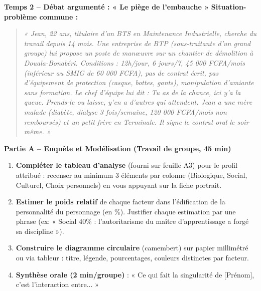 \documentclass[11pt]{article}
\newcounter{popsec}
\newcounter{popsub}
\newcommand{\courssub}[1]{%
  \stepcounter{popsub}%
  \par\vspace{9pt}\noindent{\popxbold\fontsize{11.5}{13}\selectfont\color{popink}{\color{poporange}\thepopsec.\thepopsub}\hspace{6pt}#1}\par\nopagebreak\vspace{4pt}
}
\begin{document}
\textbf{Temps 2 -- Débat argumenté : « Le piège de l'embauche »}
\textbf{Situation-problème commune :}
\begin{quote}
\textit{« Jean, 22 ans, titulaire d'un BTS en Maintenance Industrielle, cherche du travail depuis 14 mois. Une entreprise de BTP (sous-traitante d'un grand groupe) lui propose un poste de manœuvre sur un chantier de démolition à Douala-Bonabéri. Conditions : 12h/jour, 6 jours/7, 45 000 FCFA/mois (inférieur au SMIG de 60 000 FCFA), pas de contrat écrit, pas d'équipement de protection (casque, bottes, gants), manipulation d'amiante sans formation. Le chef d'équipe lui dit : \og{} Tu as de la chance, ici y'a la queue. Prends-le ou laisse, y'en a d'autres qui attendent. \fg{} Jean a une mère malade (diabète, dialyse 3 fois/semaine, 120 000 FCFA/mois non remboursés) et un petit frère en Terminale. Il signe le contrat oral le soir même. »}
\end{quote}

\courssub{Consignes}
\textbf{Partie A -- Enquête et Modélisation (Travail de groupe, 45 min)}
\begin{enumerate}
    \item \textbf{Compléter le tableau d'analyse} (fourni sur feuille A3) pour le profil attribué : recenser au minimum 3 éléments par colonne (Biologique, Social, Culturel, Choix personnels) en vous appuyant sur la fiche portrait.
    \item \textbf{Estimer le poids relatif} de chaque facteur dans l'édification de la personnalité du personnage (en \%). Justifier chaque estimation par une phrase (ex: « Social 40\% : l'autoritarisme du maître d'apprentissage a forgé sa discipline »).
    \item \textbf{Construire le diagramme circulaire} (camembert) sur papier millimétré ou via tableur : titre, légende, pourcentages, couleurs distinctes par facteur.
    \item \textbf{Synthèse orale (2 min/groupe)} : « Ce qui fait la singularité de [Prénom], c'est l'interaction entre... »
\end{enumerate}
\end{document}
